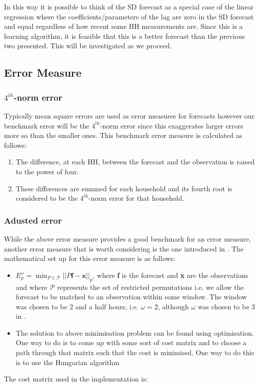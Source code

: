 \documentclass[a4paper]{article}
\begin{document}
In this way it is possible to think of the SD forecast as a special case of the linear regression where the coefficients/parameters of the lag are zero in the SD forecast and equal regardless of how recent some HH measurements are. Since this is a learning algorithm, it is feasible that this is a better forecast than the previous two presented. This will be investigated as we proceed.


\subsection{Error Measure}
\label{subsec:ErrMethods}

\subsubsection{$4^{th}$-norm error}
\label{subsubsec:4-norm} Typically mean square errors are used as error measures for forecasts however our benchmark error will be the $4^{th}$-norm error since this exaggerates larger errors more so than the smaller ones. This benchmark error measure is calculated as follows:
\begin{enumerate}
\item The difference, at each HH, between the forecast and the observation is raised to the power of four.
\item These differences are summed for each household and its fourth root is considered to be the $4^{th}$-norm error for that household.
\end{enumerate}

\subsubsection{Adusted error}
\label{subsubsec:Adj_err} While the above error measure provides a good benchmark for an error measure, another error measure that is worth considering is the one introduced in \cite{dan14}. The mathematical set up for this error measure is as follows:
\begin{itemize}
\item $E_p^\omega = \displaystyle{\min_{P \in \mathscr{P}}||P\textbf{f}-\textbf{x}||_p}$, where \textbf{f} is the forecast and \textbf{x} are the observations and where $\mathscr{P}$ represents the set of restricted permutations i.e. we allow the forecast to be matched to an observation within some window. The window was chosen to be 2 and a half hours, i.e. $\omega = 2$, although $\omega$ was chosen to be 3 in \cite{dan14}.
\item The solution to above minimisation problem can be found using optimisation. One way to do is to come up with some sort of cost matrix and to choose a path through that matrix such that the cost is minimised. One way to do this is to use the Hungarian algorithm
\end{itemize}
The cost matrix used in the implementation is: \newline
\end{document}
